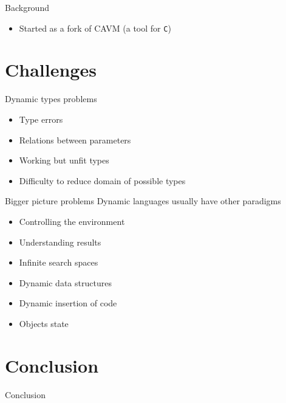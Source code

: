 \documentclass{beamer}
\begin{document}
\begin{frame}{Background}
  \begin{itemize}
    \item Started as a fork of CAVM (a tool for \texttt{C})
  \end{itemize}
\end{frame}

\begin{frame}{}
\end{frame}


\section{Challenges}

\begin{frame}{Dynamic types problems}
  \begin{itemize}
    \item Type errors
    \item Relations between parameters
    \item Working but unfit types
    \item Difficulty to reduce domain of possible types
  \end{itemize}
\end{frame}

\begin{frame}{Bigger picture problems}
  Dynamic languages usually have other paradigms

  \begin{itemize}
    \item Controlling the environment
    \item Understanding results
    \item Infinite search spaces
    \item Dynamic data structures
    \item Dynamic insertion of code
    \item Objects state
  \end{itemize}
\end{frame}


\section*{Conclusion}

\begin{frame}{Conclusion}
\end{frame}
\end{document}
